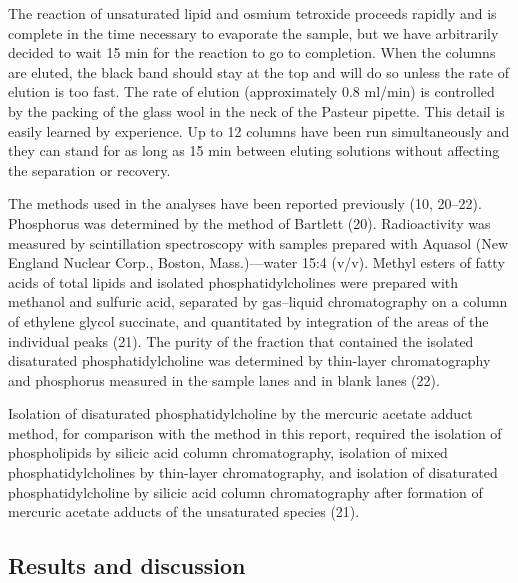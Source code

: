 \documentclass{article}
\begin{document}
The reaction of unsaturated lipid and osmium tetroxide proceeds rapidly and is complete in the time necessary to evaporate the sample, but we have arbitrarily decided to wait 15 min for the reaction to go to completion. When the columns are eluted, the black band should stay at the top and will do so unless the rate of elution is too fast. The rate of elution (approximately 0.8 ml/min) is controlled by the packing of the glass wool in the neck of the Pasteur pipette. This detail is easily learned by experience. Up to 12 columns have been run simultaneously and they can stand for as long as 15 min between eluting solutions without affecting the separation or recovery.

The methods used in the analyses have been reported previously (10, 20–22). Phosphorus was determined by the method of Bartlett (20). Radioactivity was measured by scintillation spectroscopy with samples prepared with Aquasol (New England Nuclear Corp., Boston, Mass.)—water 15:4 (v/v). Methyl esters of fatty acids of total lipids and isolated phosphatidylcholines were prepared with methanol and sulfuric acid, separated by gas–liquid chromatography on a column of ethylene glycol succinate, and quantitated by integration of the areas of the individual peaks (21). The purity of the fraction that contained the isolated disaturated phosphatidylcholine was determined by thin-layer chromatography and phosphorus measured in the sample lanes and in blank lanes (22).

Isolation of disaturated phosphatidylcholine by the mercuric acetate adduct method, for comparison with the method in this report, required the isolation of phospholipids by silicic acid column chromatography, isolation of mixed phosphatidylcholines by thin-layer chromatography, and isolation of disaturated phosphatidylcholine by silicic acid column chromatography after formation of mercuric acetate adducts of the unsaturated species (21).

\subsection*{Results and discussion}
\end{document}
